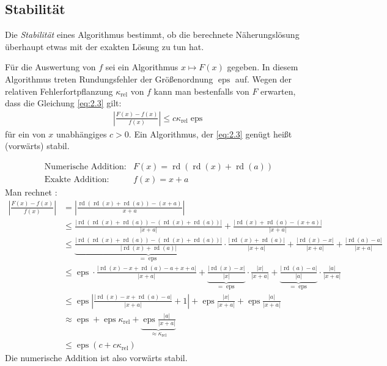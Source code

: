 \documentclass{mycourse}
\DeclareMathOperator{\rd}{rd}
\renewcommand{\eps}{\operatorname{eps}}
\newcommand{\kondrel}{\kappa_{\text{rel}}}
\begin{document}
\subsection{Stabilität}

Die \emph{Stabilität} eines Algorithmus bestimmt, ob die berechnete Näherungslösung überhaupt etwas mit der exakten Lösung zu tun hat.

Für die Auswertung von $f$ sei ein Algorithmus $x\mapsto F(x)$ gegeben.
In diesem Algorithmus treten Rundungsfehler der Größenordnung $\eps$ auf.
Wegen der relativen Fehlerfortpflanzung $\kondrel$ von $f$ kann man bestenfalls von $F$ erwarten, dass die Gleichung \eqref{eq:2.3} gilt:
\begin{align}
\label{eq:2.3}
\left|\frac{F(x)-f(x)}{f(x)}\right|\le c\kondrel\eps
\end{align}
für ein von $x$ unabhängiges $c>0$.
Ein Algorithmus, der \eqref{eq:2.3} genügt heißt (vorwärts) stabil.

\begin{ex}
\label{ex:2.5}
\begin{align*}
\text{Numerische Addition:} &F(x)= \rd(\rd(x)+\rd(a))\\
\text{Exakte Addition:} &f(x) = x+a
\end{align*}
Man rechnet :
\begin{align*}
\left|\frac{F(x)-f(x)}{f(x)}\right|
&=\left|\frac{\rd(\rd(x)+\rd(a))-(x+a)}{x+a}\right|\\
&\le \frac{|\rd(\rd(x)+\rd(a))-(\rd(x)+\rd(a))|}{|x+a|} + \frac{|\rd(x)+\rd(a)-(x+a)|}{|x+a|}\\
&\le \underbrace{\frac{|\rd(\rd(x)+\rd(a))-(\rd(x)+\rd(a))|}{|\rd(x)+\rd(a)|}}_{=\eps} \cdot \frac{|\rd(x)+\rd(a)|}{|x+a|} + \frac{|\rd(x)-x|}{|x+a|}+\frac{|\rd(a)-a|}{|x+a|}\\
&\le \eps\cdot\frac{|\rd(x)-x +\rd(a)-a +x+a|}{|x+a|}+\underbrace{\frac{|\rd(x)-x|}{|x|}}_{=\eps}\cdot\frac{|x|}{|x+a|}+\underbrace{\frac{|\rd(a)-a|}{|a|}}_{=\eps}\cdot \frac{|a|}{|x+a|}\\
&\le \eps\left|\frac{|\rd(x)-x+\rd(a)-a|}{|x+a|}+1\right|+\eps\frac{|x|}{|x+a|}+\eps\frac{|a|}{|x+a|}\\
&\approx \eps +\eps\kondrel +\underbrace{\eps\frac{|a|}{|x+a|}}_{\approx \kondrel}\\
&\le \eps(c+c\kondrel)
\end{align*}
Die numerische Addition ist also vorwärts stabil.
\end{ex}
\end{document}

